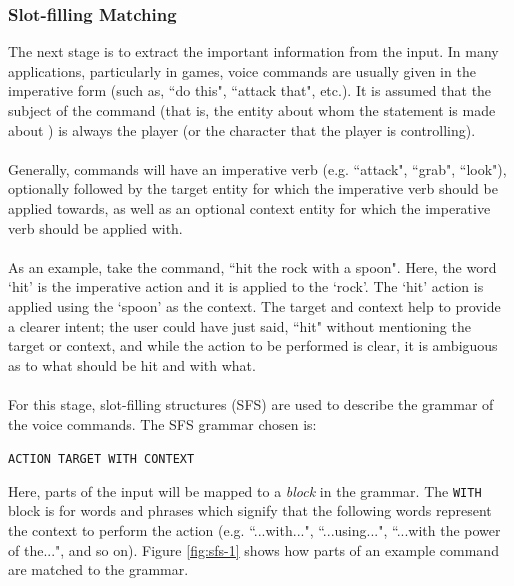 \documentclass[11pt]{article}
\begin{document}
\subsubsection{Slot-filling Matching}
\label{section:slot-filling}

The next stage is to extract the important information from the input. In many applications, particularly in games, voice commands are usually given in the imperative form (such as, ``do this", ``attack that", etc.). It is assumed that the subject of the command (that is, the entity about whom the statement is made about \cite{RefWorks:114}) is always the player (or the character that the player is controlling).
\\
\\
Generally, commands will have an imperative verb (e.g. ``attack", ``grab", ``look"), optionally followed by the target entity for which the imperative verb should be applied towards, as well as an optional context entity for which the imperative verb should be applied with.
\\
\\
As an example, take the command, ``hit the rock with a spoon". Here, the word `hit' is the imperative action and it is applied to the `rock'. The `hit' action is applied using the `spoon' as the context. The target and context help to provide a clearer intent; the user could have just said, ``hit" without mentioning the target or context, and while the action to be performed is clear, it is ambiguous as to what should be hit and with what.
\\
\\
For this stage, slot-filling structures (SFS) are used to describe the grammar of the voice commands. The SFS grammar chosen is:

\begin{center}
\texttt{ACTION TARGET WITH CONTEXT}
\end{center}

Here, parts of the input will be mapped to a \textit{block} in the grammar. The \texttt{WITH} block is for words and phrases which signify that the following words represent the context to perform the action (e.g. ``...with...", ``...using...", ``...with the power of the...", and so on). Figure \ref{fig:sfs-1} shows how parts of an example command are matched to the grammar.
\end{document}
